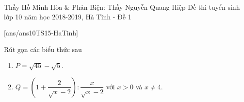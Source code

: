 \begin{name}
{Thầy Hồ Minh Hòa \& Phản Biện: Thầy Nguyễn Quang Hiệp}
{Đề thi tuyển sinh lớp 10 năm học 2018-2019, Hà Tĩnh - Đề 1}
\end{name}
\setcounter{ex}{0}
[ans/ans10TS15-HaTinh]
\begin{ex}%
	Rút gọn các biểu thức sau
	\begin{enumerate}
		\item $P=\sqrt{45} -\sqrt{5}$.
		\item $Q=\left(1+\dfrac{2}{\sqrt{x} -2} \right):\dfrac{x}{\sqrt{x} -2} $ với $x>0$ và $x\ne 4$.
	\end{enumerate}
\end{ex}
